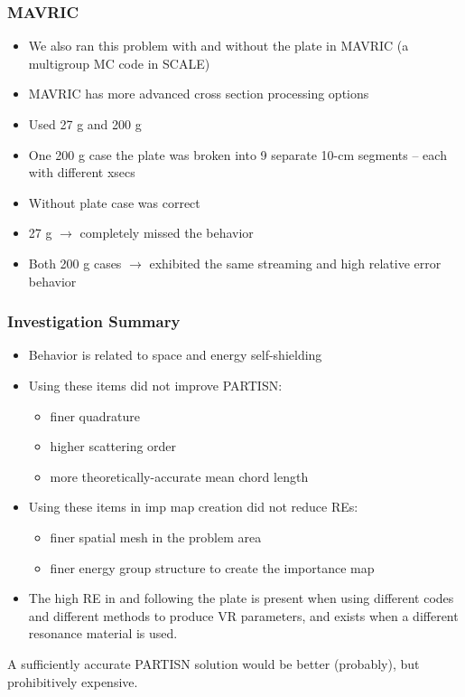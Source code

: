 \documentclass[xcolor=x11names,compress]{beamer}
\renewcommand{\(}{\begin{columns}}
\renewcommand{\)}{\end{columns}}
\newcommand{\<}[1]{\begin{column}{#1}}
\renewcommand{\>}{\end{column}}
\begin{document}
\begin{frame}[fragile]
  \frametitle{MAVRIC}
  
  \begin{itemize}
  \item We also ran this problem with and without the plate in MAVRIC (a multigroup MC code in SCALE)
  \item MAVRIC has more advanced cross section processing options
  \item Used 27 g and 200 g
  \item One 200 g case the plate was broken into 9 separate 10-cm segments – each with different xsecs
  \item Without plate case was correct
  \item 27 g $\rightarrow$ completely missed the behavior
  \item Both 200 g cases $\rightarrow$ exhibited the same streaming and high relative error behavior
  \end{itemize}
  
\end{frame}

\begin{frame}[fragile]
  \frametitle{Investigation Summary}
  
	\begin{itemize}
	\item Behavior is related to space and energy self-shielding
	\pause
	\item Using these items did not improve PARTISN:
	 \begin{itemize}
	 \item finer quadrature
	 \item higher scattering order
	 \item more theoretically-accurate mean chord length
	 \end{itemize}
	\pause 
	\item Using these items in imp map creation did not reduce REs:
	 \begin{itemize}
	 \item finer spatial mesh in the problem area
	 \item finer energy group structure to create the importance map
	 \end{itemize}
	\pause 
	\item The high RE in and following the plate is present when using different codes and different methods to produce VR parameters, and exists when a different resonance material is used.
	\end{itemize}


A sufficiently accurate PARTISN solution would be better (probably), but prohibitively expensive.
  
\end{frame}
\end{document}
